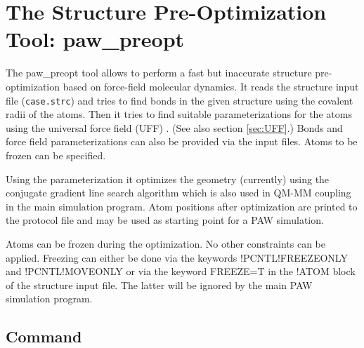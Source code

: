 \documentclass[final,12pt,makeidx,DIV=calc]{article}
\begin{document}
{{{{{{ 
 
 
 
 
 
 
 
 
 
 
 
 
 
 
 
 
 
 
 
 
 
 
 
 

\newpage
\section{The Structure Pre-Optimization Tool: paw\_preopt}

The paw\_preopt tool allows to perform a fast but inaccurate structure
pre-optimization based on force-field molecular dynamics. It reads the
structure input file (\verb'case.strc') and tries to find bonds in the given
structure using the covalent radii of the atoms. Then it tries to find
suitable parameterizations for the atoms using the universal force field (UFF)
\cite{rappe92_jacs114_10024}. (See also section \ref{sec:UFF}.) Bonds and
force field parameterizations can also be provided via the input files. Atoms
to be frozen can be specified.

Using the parameterization it optimizes the geometry (currently) using
the conjugate gradient line search algorithm which is also used in
QM-MM coupling in the main simulation program. Atom positions after
optimization are printed to the protocol file and may be used as
starting point for a PAW simulation.

Atoms can be frozen during the optimization. No other constraints can
be applied. Freezing can either be done via the keywords
!PCNTL!FREEZEONLY and !PCNTL!MOVEONLY or via the keyword FREEZE=T in
the !ATOM block of the structure input file. The latter will be
ignored by the main PAW simulation program.

\subsection{Command}

}}}}}}
\end{document}
